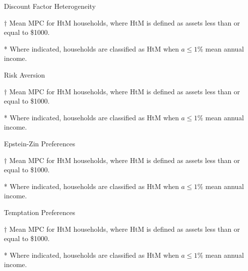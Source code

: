 \documentclass[9pt]{extarticle}
\begin{document}
\begin{table}[h]
\caption{Discount Factor Heterogeneity}
\begin{threeparttable}
\centering


\begin{tablenotes}
	\item[$\dagger$] Mean MPC for HtM households, where HtM is defined as assets less than or equal to \$1000.
	\item[*] Where indicated, households are classified as HtM when $a \leq 1\%$ mean annual income.
\end{tablenotes}
\end{threeparttable}
\end{table}

\begin{table}[h]
\caption{Risk Aversion}
\begin{threeparttable}
\centering


\begin{tablenotes}
	\item[$\dagger$] Mean MPC for HtM households, where HtM is defined as assets less than or equal to \$1000.
	\item[*] Where indicated, households are classified as HtM when $a \leq 1\%$ mean annual income.
\end{tablenotes}
\end{threeparttable}
\end{table}

\begin{table}[h]
\caption{Epstein-Zin Preferences}
\begin{threeparttable}
\centering


\begin{tablenotes}
	\item[$\dagger$] Mean MPC for HtM households, where HtM is defined as assets less than or equal to \$1000.
	\item[*] Where indicated, households are classified as HtM when $a \leq 1\%$ mean annual income.
\end{tablenotes}
\end{threeparttable}
\end{table}

\begin{table}[h]
\caption{Temptation Preferences}
\begin{threeparttable}
\centering


\begin{tablenotes}
	\item[$\dagger$] Mean MPC for HtM households, where HtM is defined as assets less than or equal to \$1000.
	\item[*] Where indicated, households are classified as HtM when $a \leq 1\%$ mean annual income.
\end{tablenotes}
\end{threeparttable}
\end{table}
\end{document}
